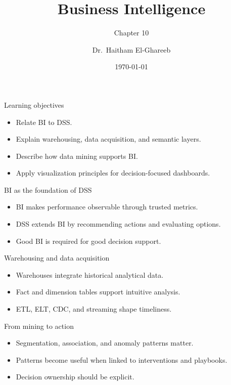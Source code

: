 \documentclass[aspectratio=169,11pt]{beamer}
\title[Business Intelligence]{Business Intelligence}
\subtitle{Chapter 10}
\author{Dr.\ Haitham El-Ghareeb}
\institute{Faculty of Computers and Information Sciences}
\date{\today}
\begin{document}
\begin{frame}
  \titlepage
\end{frame}

\begin{frame}{Learning objectives}
  \begin{itemize}
    \item Relate BI to DSS.
    \item Explain warehousing, data acquisition, and semantic layers.
    \item Describe how data mining supports BI.
    \item Apply visualization principles for decision-focused dashboards.
  \end{itemize}
\end{frame}

\begin{frame}{BI as the foundation of DSS}
  \begin{itemize}
    \item BI makes performance observable through trusted metrics.
    \item DSS extends BI by recommending actions and evaluating options.
    \item Good BI is required for good decision support.
  \end{itemize}
\end{frame}

\begin{frame}{Warehousing and data acquisition}
  \begin{itemize}
    \item Warehouses integrate historical analytical data.
    \item Fact and dimension tables support intuitive analysis.
    \item ETL, ELT, CDC, and streaming shape timeliness.
  \end{itemize}
\end{frame}

\begin{frame}{From mining to action}
  \begin{itemize}
    \item Segmentation, association, and anomaly patterns matter.
    \item Patterns become useful when linked to interventions and playbooks.
    \item Decision ownership should be explicit.
  \end{itemize}
\end{frame}
\end{document}
